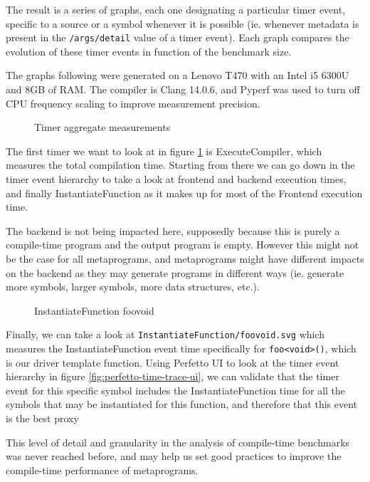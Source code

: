 \documentclass[../main]{subfiles}
\begin{document}
The result is a series of graphs, each one designating a particular timer event,
specific to a source or a symbol whenever it is possible (ie. whenever metadata
is present in the \lstinline{/args/detail} value of a timer event). Each graph
compares the evolution of these timer events in function of the benchmark size.

The graphs following were generated on a Lenovo T470 with an Intel i5 6300U and
8GB of RAM. The compiler is Clang 14.0.6, and Pyperf \cite{pyperf} was used
to turn off CPU frequency scaling to improve measurement precision.

\begin{figure}[h]
\fontsize{8}{10}\selectfont

\caption{Timer aggregate measurements}
\label{fig:total-timers}
\end{figure}

The first timer we want to look at in figure \ref{fig:total-timers} is
ExecuteCompiler, which measures the total compilation time.
Starting from there we can go down in the timer event hierarchy to take a look
at frontend and backend execution times, and finally InstantiateFunction as
it makes up for most of the Frontend execution time.

The backend is not being impacted here, supposedly because this is purely a
compile-time program and the output program is empty. However this might not be
the case for all metaprograms, and metaprograms might have different impacts on
the backend as they may generate programs in different ways (ie. generate more
symbols, larger symbols, more data structures, etc.).

\begin{figure}[h]
\fontsize{8}{10}\selectfont

\caption{InstantiateFunction foovoid}
\end{figure}

Finally, we can take a look at \lstinline{InstantiateFunction/foovoid.svg} which
measures the InstantiateFunction event time specifically for
\lstinline{foo<void>()}, which is our driver template function. Using Perfetto
UI to look at the timer event hierarchy in
figure \ref{fig:perfetto-time-trace-ui}, we can validate that the timer event
for this specific symbol includes the InstantiateFunction time for all the
symbols that may be instantiated for this function, and therefore that this
event is the best proxy

This level of detail and granularity in the analysis of compile-time benchmarks
was never reached before, and may help us set good practices to improve the
compile-time performance of metaprograms.
\end{document}
